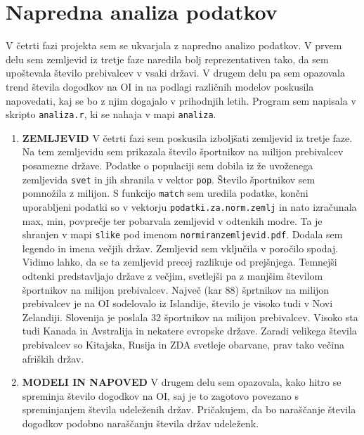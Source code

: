 \documentclass[11pt,a4paper]{article}
\begin{document}
\section{Napredna analiza podatkov}
V četrti fazi projekta sem se ukvarjala z napredno analizo podatkov. V prvem delu sem zemljevid iz tretje faze naredila bolj reprezentativen tako, da sem upoštevala število prebivalcev v vsaki državi. V drugem delu pa sem opazovala trend števila dogodkov na OI in na podlagi različnih modelov poskusila napovedati, kaj se bo z njim dogajalo v prihodnjih letih. Program sem napisala v skripto \verb|analiza.r|, ki se nahaja v mapi \verb|analiza|.
\newline
\begin{enumerate}
\item{\textbf{ZEMLJEVID}
\newline
V četrti fazi sem poskusila izboljšati zemljevid iz tretje faze. Na tem zemljevidu sem prikazala število športnikov na milijon prebivalcev posamezne države. Podatke o populaciji sem dobila iz že uvoženega zemljevida \verb|svet| in jih shranila v vektor \verb|pop|. Število športnikov sem pomnožila z milijon. S funkcijo \verb|match| sem uredila podatke, končni uporabljeni podatki so v vektorju \verb|podatki.za.norm.zemlj| in nato izračunala max, min, povprečje ter pobarvala zemljevid v odtenkih modre. Ta je shranjen v mapi \verb|slike| pod imenom \verb|normiranzemljevid.pdf|. Dodala sem legendo in imena večjih držav. Zemljevid sem vključila v poročilo spodaj.
\newline
Vidimo lahko, da se ta zemljevid precej razlikuje od prejšnjega. Temnejši odtenki predstavljajo države z večjim, svetlejši pa z manjšim številom športnikov na milijon prebivalcev. Največ (kar 88) šprtnikov na milijon prebivalcev je na OI sodelovalo iz Islandije, število je visoko tudi v Novi Zelandiji. Slovenija je poslala 32 športnikov na milijon prebivalcev. Visoko sta tudi Kanada in Avstralija in nekatere evropske države. Zaradi velikega števila prebivalcev so Kitajska, Rusija in ZDA svetleje obarvane, prav tako večina afriških držav.
}
\newpage
\item{\textbf{MODELI IN NAPOVED}
\newline
V drugem delu sem opazovala, kako hitro se spreminja število dogodkov na OI, saj je to zagotovo povezano s spreminjanjem števila udeleženih držav. Pričakujem, da bo naraščanje števila dogodkov podobno naraščanju števila držav udeleženk.
\newline
}
\end{enumerate}
\end{document}
